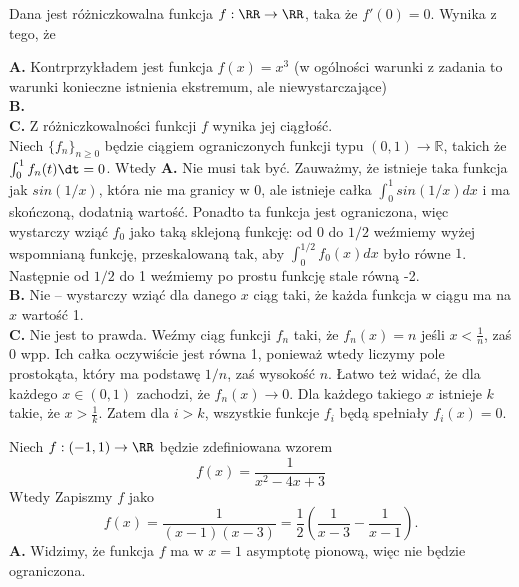 \begin{solutions}
    \sol Dana jest różniczkowalna funkcja $f: \RR \to \RR$, taka że $f'(0) = 0$. Wynika z tego, że

    \textbf{A.} Kontrprzykładem jest funkcja $f(x) = x^3$ (w ogólności warunki z zadania to warunki konieczne istnienia ekstremum, ale niewystarczające) \\
    \textbf{B.}  \\
    \textbf{C.} Z różniczkowalności funkcji $f$ wynika jej ciągłość. \\

    \sol Niech $\{f_n\}_{n \geq 0}$ będzie ciągiem ograniczonych funkcji typu $(0, 1) \to \mathbb{R}$, takich że $\int_0^1{f_n(t) \dt} = 0$. Wtedy
    \textbf{A.} Nie musi tak być. Zauważmy, że istnieje taka funkcja jak $sin(1/x)$, która nie ma granicy w 0, ale istnieje całka $\int_0^1 sin(1/x) dx$ i ma skończoną, dodatnią wartość. Ponadto ta funkcja jest ograniczona, więc wystarczy wziąć $f_0$ jako taką sklejoną funkcję: od 0 do $1/2$ weźmiemy wyżej wspomnianą funkcję, przeskalowaną tak, aby $\int_0^{1/2} f_0(x) dx$ było równe $1$. Następnie od $1/2$ do 1 weźmiemy po prostu funkcję stale równą -2. \\
    \textbf{B.} Nie -- wystarczy wziąć dla danego $x$ ciąg taki, że każda funkcja w ciągu ma na $x$ wartość 1. \\
    \textbf{C.} Nie jest to prawda. Weźmy ciąg funkcji $f_n$ taki, że $f_n(x) = n$ jeśli $x < \frac1n$, zaś 0 wpp. Ich całka oczywiście jest równa 1, ponieważ wtedy liczymy pole prostokąta, który ma podstawę $1/n$, zaś wysokość $n$. Łatwo też widać, że dla każdego $x \in (0, 1)$ zachodzi, że $f_n(x) \to 0$. Dla każdego takiego $x$ istnieje $k$ takie, że $x > \frac1k$. Zatem dla $i > k$, wszystkie funkcje $f_i$ będą spełniały $f_i(x) = 0$.
    
    \sol Niech $f : (-1, 1) \to \RR$ będzie zdefiniowana wzorem
    $$f(x) = \frac{1}{x^2 - 4x + 3}$$
    Wtedy
    Zapiszmy $f$ jako
    $$
    f(x) = \frac{1}{(x-1)(x-3)} = \frac{1}{2}\left(\frac{1}{x-3}-\frac{1}{x-1}\right).
    $$
    \textbf{A.} Widzimy, że funkcja $f$ ma w $x=1$ asymptotę pionową, więc nie będzie ograniczona.


\end{solutions}
